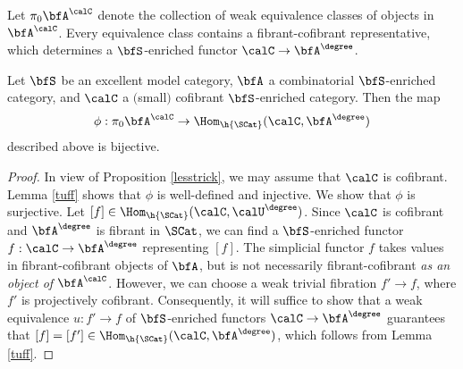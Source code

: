 \begin{Simplicial Categories}

Let $\pi_0 \bfA^{\calC}$ denote the collection of
weak equivalence classes of objects in $\bfA^{\calC}$. Every
equivalence class contains a fibrant-cofibrant representative, which
determines a $\bfS$-enriched functor $\calC \rightarrow \bfA^{\degree}$. 

\begin{proposition}\label{gumbaa}
Let $\bfS$ be an excellent model category, $\bfA$ a combinatorial
$\bfS$-enriched category, and $\calC$ a $($small$)$ cofibrant $\bfS$-enriched category.
Then the map
$$ \phi: \pi_0 \bfA^{\calC} \rightarrow \Hom_{\h{\SCat}}(\calC, \bfA^{\degree})$$
described above is bijective.
\end{proposition}

\begin{proof}
In view of Proposition \ref{lesstrick}, we may assume that $\calC$ is cofibrant.
Lemma \ref{tuff} shows that $\phi$ is well-defined and injective.
We show that $\phi$ is surjective. Let $[f] \in \Hom_{\h{\SCat}}(
\calC,\calU^{\degree})$. Since $\calC$ is cofibrant and $\bfA^{\degree}$
is fibrant in $\SCat$, we can find a $\bfS$-enriched functor $f: \calC
\rightarrow \bfA^{\degree}$ representing $[f]$. The simplicial
functor $f$ takes values in fibrant-cofibrant objects of $\bfA$,
but is not necessarily fibrant-cofibrant {\em as an object of}
$\bfA^{\calC}$. However, we can choose a 
weak trivial fibration $f' \rightarrow f$, where $f'$ is projectively cofibrant.
Consequently, it will suffice to show that a weak equivalence $u: f' \rightarrow f$
of $\bfS$-enriched functors $\calC \rightarrow \bfA^{\degree}$
guarantees that $[f] = [f'] \in \Hom_{\h{\SCat}}(\calC, \bfA^{\degree})$, which follows
from Lemma \ref{tuff}.
\end{proof}


\end{Simplicial Categories}
